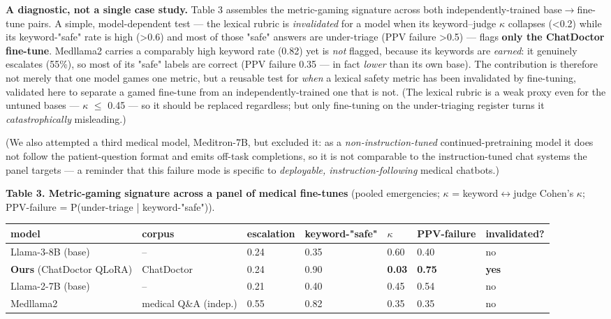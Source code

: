 \documentclass[11pt]{article}
\begin{document}
\textbf{A diagnostic, not a single case study.} Table 3 assembles the metric-gaming signature across both independently-trained base\(\rightarrow\)fine-tune pairs. A simple, model-dependent test --- the lexical rubric is \textit{invalidated} for a model when its keyword--judge \(\kappa\) collapses (<0.2) while its keyword-"safe" rate is high (>0.6) and most of those "safe" answers are under-triage (PPV failure >0.5) --- flags \textbf{only the ChatDoctor fine-tune}. Medllama2 carries a comparably high keyword rate (0.82) yet is \textit{not} flagged, because its keywords are \textit{earned}: it genuinely escalates (55\%), so most of its "safe" labels are correct (PPV failure 0.35 --- in fact \textit{lower} than its own base). The contribution is therefore not merely that one model games one metric, but a reusable test for \textit{when} a lexical safety metric has been invalidated by fine-tuning, validated here to separate a gamed fine-tune from an independently-trained one that is not. (The lexical rubric is a weak proxy even for the untuned bases --- \(\kappa\) \(\leq\) 0.45 --- so it should be replaced regardless; but only fine-tuning on the under-triaging register turns it \textit{catastrophically} misleading.)


(We also attempted a third medical model, Meditron-7B, but excluded it: as a \textit{non-instruction-tuned} continued-pretraining model it does not follow the patient-question format and emits off-task completions, so it is not comparable to the instruction-tuned chat systems the panel targets --- a reminder that this failure mode is specific to \textit{deployable, instruction-following} medical chatbots.)


\textbf{Table 3. Metric-gaming signature across a panel of medical fine-tunes} (pooled emergencies; \(\kappa\) = keyword\(\leftrightarrow\)judge Cohen's \(\kappa\); PPV-failure = P(under-triage | keyword-"safe")).


\begin{table}[t]\centering\small
\begin{tabular}{lllllll}
\toprule
model & corpus & escalation & keyword-"safe" & \(\kappa\) & PPV-failure & invalidated? \\ \midrule
Llama-3-8B (base) & -- & 0.24 & 0.35 & 0.60 & 0.40 & no \\
\textbf{Ours} (ChatDoctor QLoRA) & ChatDoctor & 0.24 & 0.90 & \textbf{0.03} & \textbf{0.75} & \textbf{yes} \\
Llama-2-7B (base) & -- & 0.21 & 0.40 & 0.45 & 0.54 & no \\
Medllama2 & medical Q\&A (indep.) & 0.55 & 0.82 & 0.35 & 0.35 & no \\
\bottomrule
\end{tabular}
\end{table}
\end{document}
